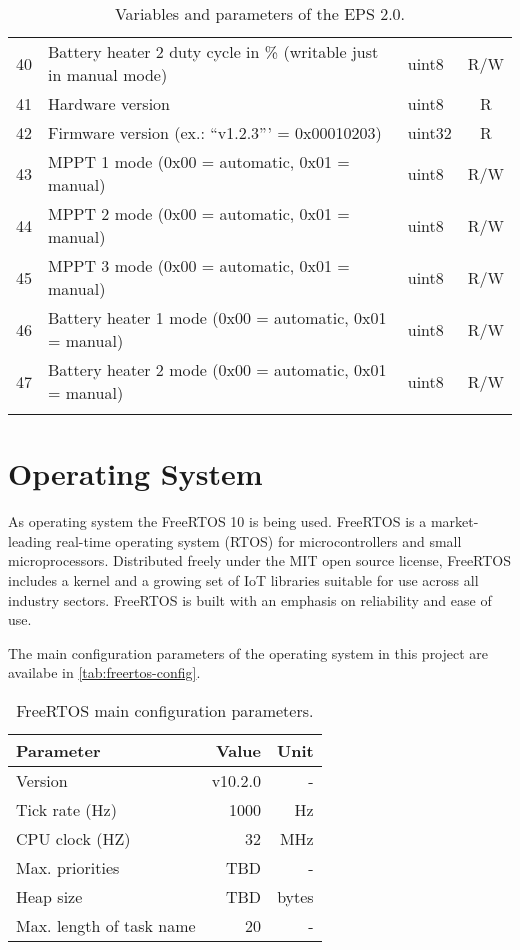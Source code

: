 \begin{longtable}[c]{cL{0.72\textwidth}lc}
    40  & Battery heater 2 duty cycle in \% (writable just in manual mode)  & uint8  & R/W \\
    41  & Hardware version                                                  & uint8  & R \\
    42  & Firmware version (ex.: ``v1.2.3''' = 0x00010203)                  & uint32 & R \\
    43  & MPPT 1 mode (0x00 = automatic, 0x01 = manual)                     & uint8  & R/W \\
    44  & MPPT 2 mode (0x00 = automatic, 0x01 = manual)                     & uint8  & R/W \\
    45  & MPPT 3 mode (0x00 = automatic, 0x01 = manual)                     & uint8  & R/W \\
    46  & Battery heater 1 mode (0x00 = automatic, 0x01 = manual)           & uint8  & R/W \\
    47  & Battery heater 2 mode (0x00 = automatic, 0x01 = manual)           & uint8  & R/W \\
    \bottomrule[1.5pt]
    \caption{Variables and parameters of the EPS 2.0.}
    \label{tab:eps2-variables}
\end{longtable}

\section{Operating System}

As operating system the FreeRTOS 10 \cite{freertos} is being used. FreeRTOS is a market-leading real-time operating system (RTOS) for microcontrollers and small microprocessors. Distributed freely under the MIT open source license, FreeRTOS includes a kernel and a growing set of IoT libraries suitable for use across all industry sectors. FreeRTOS is built with an emphasis on reliability and ease of use.

The main configuration parameters of the operating system in this project are availabe in \autoref{tab:freertos-config}.

\begin{table}[!h]
    \centering
    \begin{tabular}{lrr}
        \toprule[1.5pt]
        \textbf{Parameter}       & \textbf{Value} & \textbf{Unit} \\
        \midrule
        Version                  & v10.2.0        & - \\
        Tick rate (Hz)           & 1000           & Hz \\
        CPU clock (HZ)           & 32             & MHz \\
        Max. priorities          & TBD            & - \\
        Heap size                & TBD            & bytes \\
        Max. length of task name & 20             & - \\
        \bottomrule[1.5pt]
    \end{tabular}
    \caption{FreeRTOS main configuration parameters.}
    \label{tab:freertos-config}
\end{table}


